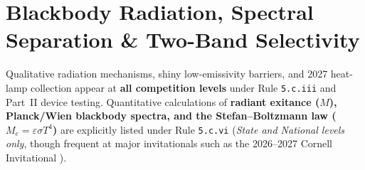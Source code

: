 \section{Blackbody Radiation, Spectral Separation \& Two-Band Selectivity}
\label{sec:12.1}

\begin{tierbox}
Qualitative radiation mechanisms, shiny low-emissivity barriers, and 2027 heat-lamp collection appear at \textbf{all competition levels} under Rule \texttt{5.c.iii} and Part~II device testing. Quantitative calculations of \textbf{radiant exitance ($M$), Planck/Wien blackbody spectra, and the Stefan--Boltzmann law ($M_e = \varepsilon\sigma T^4$)} are explicitly listed under Rule \texttt{5.c.vi} (\emph{State and National levels only}, though frequent at major invitationals such as the 2026--2027 Cornell Invitational ).
\end{tierbox}

